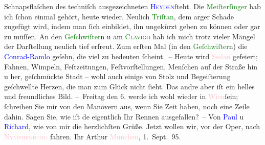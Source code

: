                     Schnapsflaſchen des techniſch ausgezeichneten \textcolor{blue}{\textsc{Heyden}}{}\ledrightnote{\textcolor{blue}{Hubert Heyden}}{ }ſteht. Die \textcolor{green}{Meiſterſinger}{}\ledrightnote{\textcolor{green}{Die Meistersinger von Nürnberg}} hab ich ſchon einmal gehört, heute wieder. Neulich \textcolor{green}{Triſtan}{}\ledrightnote{\textcolor{green}{Tristan und Isolde}}, dem arger Schade zugefügt wird, indem
                    man ſich einbildet, ihn ungekürzt geben zu können oder gar zu müſſen. An den \textcolor{green}{Geſchwiſter}{}\ledrightnote{\textcolor{green}{Die Geschwister}}n u am \textcolor{green}{\textsc{Clavigo}}{}\ledrightnote{\textcolor{green}{Clavigo}} hab ich mich trotz vieler Mängel der Darſtellung {\pb}neulich tief erfreut. Zum erſten Mal (in den \textcolor{green}{Geſchwiſter}{}\ledrightnote{\textcolor{green}{Die Geschwister}}n) die \textcolor{blue}{Conrad-Ramlo}{}\ledrightnote{\textcolor{blue}{Marie Conrad-Ramlo}} geſehn, die viel zu bedeuten ſcheint. –
                    Heute wird \textcolor{pink}{Sedan}{}\ledrightnote{\textcolor{pink}{Sedan}} gefeiert; Fahnen, Wimpeln,
                    Feſtzeitungen, Feſtvorſtellungen, Menſchen auf der Straße hin u her, geſchmückte
                    Stadt – wohl auch einige von Stolz und Begeiſterung geſchwellte Herzen, die man
                    zum Glück nicht ſieht. Das andre aber iſt ein helles und freundliches Bild.\pend
           \pstart
           – Freitag den 6. werde ich wohl wieder in \textcolor{pink}{Wien}{}\ledrightnote{\textcolor{pink}{Wien}}{ }ſein; ſchreiben Sie mir von den Manövern aus,
                    wenn Sie Zeit haben, noch eine Zeile dahin. Sagen Sie, wie iſt de{\geminationn} eigentlich {\pb}Ihr
                    Rennen ausgefallen? –\pend
           \pstart
           Von \textcolor{blue}{Paul}{}\ledrightnote{\textcolor{blue}{Paul Goldmann}} u \textcolor{blue}{Richard}{}\ledrightnote{\textcolor{blue}{Richard Beer-Hofmann}}, wie von mir die herzlichſten Grüße. Jetzt wollen wir, vor der
                    Oper, nach \textcolor{pink}{\textsc{Nymphenburg}}{}\ledrightnote{\textcolor{pink}{Neuhausen-Nymphenburg}} fahren.\pend
           \pstart Ihr \spacefill\mbox{Arthur}\pend{}\pstart
           \textcolor{pink}{München}{}\ledrightnote{\textcolor{pink}{München}},
                        1. Sept. 95.\pend
           \endnumbering{}  
      